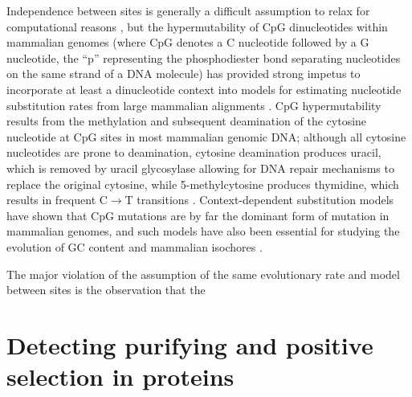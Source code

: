 Independence between sites is generally a difficult assumption to
relax for computational reasons \citep{TODO}, but the hypermutability
of CpG dinucleotides within mammalian genomes (where CpG denotes a C
nucleotide followed by a G nucleotide, the ``p'' representing the
phosphodiester bond separating nucleotides on the same strand of a DNA
molecule) has provided strong impetus to incorporate at least a
dinucleotide context into models for estimating nucleotide
substitution rates from large mammalian alignments
\citep{Blake1992,Hwang2004a,Siepel2004a}. CpG hypermutability results
from the methylation and subsequent deamination of the cytosine
nucleotide at CpG sites in most mammalian genomic DNA; although all
cytosine nucleotides are prone to deamination, cytosine deamination
produces uracil, which is removed by uracil glycosylase allowing for
DNA repair mechanisms to replace the original cytosine, while
5-methylcytosine produces thymidine, which results in frequent C$\to$T
transitions \citep{Ehrlich1982,Hwang2004a}. Context-dependent
substitution models have shown that CpG mutations are by far the
dominant form of mutation in mammalian genomes, and such models have
also been essential for studying the evolution of GC content and
mammalian isochores \citep{Duret2006,Duret2008}.

The major violation of the assumption of the same evolutionary rate
and model between sites is the observation that the


\section{Detecting purifying and positive selection in proteins}
\label{pos-sel_intro}


